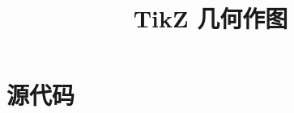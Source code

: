 \documentclass[a4paper, titlepage, 12pt]{ctexbook}
\title{TikZ 几何作图}
\begin{document}
\raggedbottom 

\frontmatter

\maketitle

\tableofcontents

\mainmatter




\appendix



\chapter{源代码}
\inputminted{latex}{../tikzlibraryeuclidea.code.tex}

\backmatter

\cleardoublepage
{}



\end{document}
